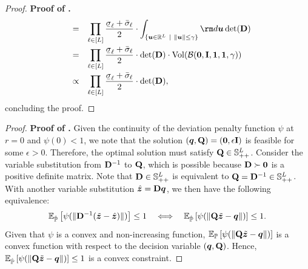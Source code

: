 \documentclass[mnsc, nonblindrev]{informswp}
\newcommand{\1}[1]{\mathds{1}{\left(#1\right)}}
\begin{document}
\begin{appendices}
\begin{proof}{\bf Proof of .}
$$\begin{array}{rcl}
& = & \displaystyle \prod_{\ell \in [L]} \frac{\ubar{\sigma}_{\ell} + \bar{\sigma}_{\ell}}{2} \cdot \int_{\{ \bm u \in \mathbb{R}^L ~|~ \| \bm u\| \leq \gamma \}} {\rm d} \bm u  \det(\mb D) \\[5mm]
& = & \displaystyle \prod_{\ell \in [L]} \frac{\ubar{\sigma}_{\ell} + \bar{\sigma}_{\ell}}{2} \cdot \det(\mb D) \cdot \mathrm{Vol}(\cB(\bm 0, \mb I, \bm 1, \bm 1,\gamma)) \\[5mm]
& \propto & \displaystyle \prod_{\ell \in [L]} \frac{\ubar{\sigma}_{\ell} + \bar{\sigma}_{\ell}}{2} \cdot \det(\mb D),
\end{array}
$$
concluding the proof.
\hfill \Halmos
\end{proof}
\vspace{3mm}

\begin{proof}{\bf Proof of .} 
Given the continuity of the deviation penalty function $\psi$ at $r=0$ and $\psi(0)<1$, we note that the solution $(\bm q, {\mathbf{Q}}) = ({\mathbf{0}}, \epsilon {\mathbf{I}})$ is feasible for some $\epsilon >0$. Therefore, the optimal solution must satisfy  ${\mathbf{Q}} \in \mathbb{S}^L_{++}$.  Consider the variable substitution from ${\mathbf{D}}^{-1}$ to  ${\mathbf{Q}}$, which is possible because ${\mathbf{D}}  \succ \bm 0$ is a positive definite matrix. Note that ${\mathbf{D}} \in  \mathbb{S}^{L}_{++}$ is equivalent to ${\mathbf{Q}} = {\mathbf{D}}^{-1} \in \mathbb{S}^{L}_{++}$. With another variable substitution $\hat{\bm{z}} = {\mathbf{D}}\bm{q}$, we then have the following equivalence:
$$
\mathbb{E}_{\hat{\mathbb{P}}}\left[\psi(\|{\mathbf{D}}^{-1}( \tilde{\bm{z}} - \hat{\bm{z}}) \|)\right] \leq 1 
~~~\Longleftrightarrow~~~
\mathbb{E}_{\hat{\mathbb{P}}}\left[\psi(\|{\mathbf{Q}} \tilde{\bm{z}} - \bm q \|)\right] \leq 1.
$$
Given that $\psi$ is a convex and non-increasing function, $\mathbb{E}_{\mathbb{P}}\left[\psi(\|{\mathbf{Q}} \tilde{\bm{z}} - \bm q \|)\right]$ is a convex function with respect to the decision variable $(\bm q,{\mathbf{Q}})$. Hence, $\mathbb{E}_{\hat{\mathbb{P}}}\left[\psi(\|{\mathbf{Q}} \tilde{\bm{z}} - \bm q \|)\right] \leq 1$ is a convex constraint.


\end{proof}
\end{appendices}
\end{document}
